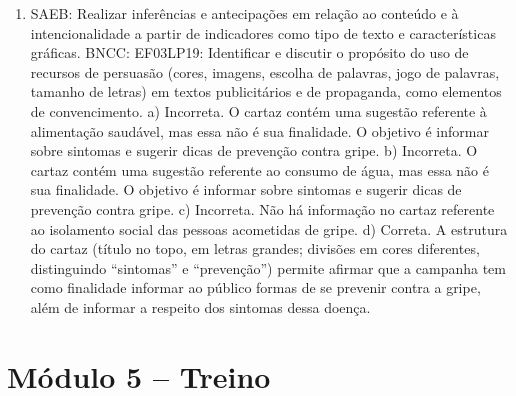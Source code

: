 \begin{enumerate}
\item
SAEB: Realizar inferências e antecipações em relação ao conteúdo
e à intencionalidade a partir de indicadores como tipo de texto e
características gráficas.
BNCC: EF03LP19: Identificar e discutir o propósito do uso de recursos de
persuasão (cores, imagens, escolha de palavras, jogo de palavras,
tamanho de letras) em textos publicitários e de propaganda, como
elementos de convencimento.
a) Incorreta. O cartaz contém uma sugestão referente à alimentação 
saudável, mas essa não é sua finalidade. O objetivo é informar sobre 
sintomas e sugerir dicas de prevenção contra gripe.  
b) Incorreta. O cartaz contém uma sugestão referente ao consumo de água,
mas essa não é sua finalidade. O objetivo é informar sobre sintomas e 
sugerir dicas de prevenção contra gripe.
c) Incorreta. Não há informação no cartaz referente ao isolamento social 
das pessoas acometidas de gripe. 
d) Correta. A estrutura do cartaz (título no topo, em letras grandes; 
divisões em cores diferentes, distinguindo ``sintomas'' e ``prevenção'') 
permite afirmar que a campanha tem como finalidade informar ao público 
formas de se prevenir contra a gripe, além de informar a respeito dos
sintomas dessa doença.
\end{enumerate}

\section*{Módulo 5 – Treino}

